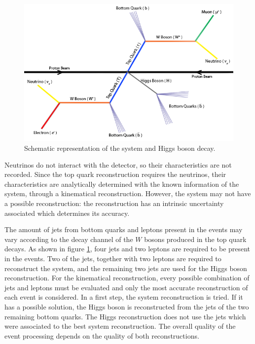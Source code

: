 \begin{figure}[!htp]
	\begin{center}
		\includegraphics[scale=0.45]{imgs/ttbar_higgs.png}
		\caption{Schematic representation of the \ttbar system and Higgs boson decay.}
		\label{fig:ttbar}
	\end{center}
\end{figure}

Neutrinos do not interact with the detector, so their characteristics are not recorded. Since the top quark reconstruction requires the neutrinos, their characteristics are analytically determined with the known information of the system, through a kinematical reconstruction. However, the \ttbar system may not have a possible reconstruction: the reconstruction has an intrinsic uncertainty associated which determines its accuracy.

The amount of jets from bottom quarks and leptons present in the events may vary according to the decay channel of the $W$ bosons produced in the top quark decays. As shown in figure \ref{fig:ttbar}, four jets and two leptons are required to be present in the events. Two of the jets, together with two leptons are required to reconstruct the \ttbar system, and the remaining two jets are used for the Higgs boson reconstruction. For the kinematical reconstruction, every possible combination of jets and leptons must be evaluated and only the most accurate reconstruction of each event is considered. In a first step, the \ttbar system reconstruction is tried.  If it has a possible solution, the Higgs boson is reconstructed from the jets of the two remaining bottom quarks. The Higgs reconstruction does not use the jets which were associated to the best \ttbar system reconstruction. The overall quality of the event processing depends on the quality of both reconstructions.

